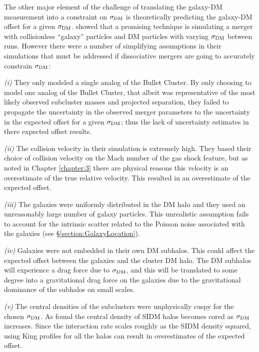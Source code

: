 The other major element of the challenge of translating the galaxy-DM measurement into a constraint on $\sigma_{\rm DM}$ is theoretically predicting the galaxy-DM offset for a given $\sigma_{\rm DM}$.
\citet{Randall:2008hs} showed that a promising technique is simulating a merger with collisionless ``galaxy'' particles and DM particles with varying $\sigma_{\rm DM}$ between runs.
However there were a number of simplifying assumptions in their simulations that must be addressed if dissociative mergers are going to accurately constrain $\sigma_{\rm DM}$: 

\textit{(i)} They only modeled a single analog of the Bullet Cluster. 
By only choosing to model one analog of the Bullet Cluster, that albeit was representative of the most likely observed subcluster masses and projected separation, they failed to propagate the uncertainty in the observed merger parameters to the uncertainty in the expected offset for a given $\sigma_{\rm DM}$; thus the lack of uncertainty estimates in there expected offset results.

\textit{(ii)} The collision velocity in their simulation is extremely high.
They based their choice of collision velocity on the Mach number of the gas shock feature, but as noted in Chapter \ref{chapter:3} there are physical reasons this velocity is an overestimate of the true relative velocity.
This resulted in an overestimate of the expected offset.
	
\textit{(iii)} The galaxies were uniformly distributed in the DM halo and they used an unreasonably large number of galaxy particles. 
This unrealistic assumption fails to account for the intrinsic scatter related to the Poisson noise associated with the galaxies (see \S\ref{section:GalaxyLocation}).

\textit{(iv)} Galaxies were not embedded in their own DM subhalos.
This could affect the expected offset between the galaxies and the cluster DM halo. The DM subhalos will experience a drag force due to  $\sigma_{\rm DM}$, and this will be translated to some degree into a gravitational drag force on the galaxies due to the gravitational dominance of the subhalos on small scales. 

\textit{(v)} The central densities of the subclusters were unphysically cuspy for the chosen $\sigma_{\rm DM}$.
As \citet{Rocha:2012tr} found the central density of SIDM halos becomes cored as $\sigma_{\rm DM}$ increases.
Since the interaction rate scales roughly as the SIDM density squared, using King profiles for all the halos can result in overestimates of the expected offset. 

